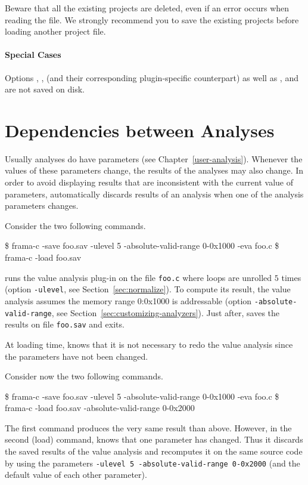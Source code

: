\begin{important}
Beware that all the existing projects are deleted, even if an error occurs when
reading the file. We strongly recommend you to save the existing projects before
loading another project file.
\end{important}

\paragraph{Special Cases}

Options , ,
\xspace(and 
their corresponding plugin-specific counterpart) 
as well as , \xspace and
\xspace are not saved on disk.

\section{Dependencies between Analyses}

Usually analyses do have parameters (see Chapter~\ref{user-analysis}). Whenever
the values of these parameters change, the results of the analyses may also
change. In order to avoid displaying results that are inconsistent with the
current value of parameters, \FramaC automatically discards results of an
analysis when one of the analysis parameters changes.

Consider the two following
commands.%
\begin{shell}
\$ frama-c -save foo.sav -ulevel 5 -absolute-valid-range 0-0x1000 -eva foo.c
\$ frama-c -load foo.sav
\end{shell}
\FramaC runs the value analysis plug-in on the file \texttt{foo.c} where loops
are unrolled $5$ times (option \texttt{-ulevel}, see
Section~\ref{sec:normalize}). To compute its result, the value analysis
assumes the memory range 0:0x1000 is addressable  (option
\texttt{-absolute-valid-range}, see Section~\ref{sec:customizing-analyzers}).
Just
after, \FramaC saves the results on file \texttt{foo.sav} and exits.

At loading time, \FramaC knows that it is not necessary to redo the value
analysis since the parameters have not been changed.

Consider now the two following commands.
%
\begin{shell}
\$ frama-c -save foo.sav -ulevel 5 -absolute-valid-range 0-0x1000 -eva foo.c
\$ frama-c -load foo.sav -absolute-valid-range 0-0x2000
\end{shell}
The first command produces the very same result than above. However, in the
second (load) command, \FramaC knows that one parameter has changed. Thus it
discards the saved results of the value analysis and recomputes it on the same
source code by using the parameters
\texttt{-ulevel 5 -absolute-valid-range 0-0x2000} (and the
default value of each other parameter).

